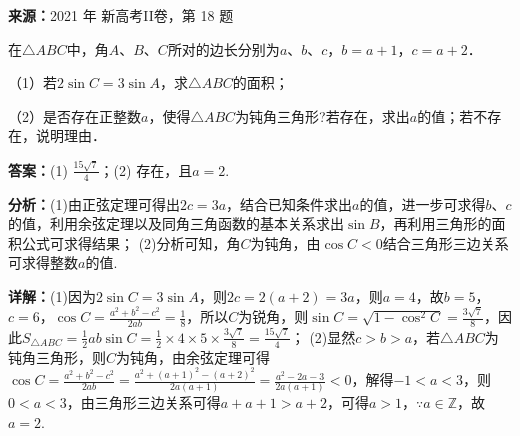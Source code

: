 \begin{question}[points=12]
\textbf{来源：}2021 年 新高考II卷，第 18 题\par
在$\triangle ABC$中，角$A$、$B$、$C$所对的边长分别为$a$、$b$、$c$，$b=a+1$，$c=a+2$．

（1）若$2\sin C=3\sin A$，求$\triangle ABC$的面积；

（2）是否存在正整数$a$，使得$\triangle ABC$为钝角三角形?若存在，求出$a$的值；若不存在，说明理由．
\begin{solution}
\textbf{答案：}(1) $\frac{15\sqrt{7}}{4}$；(2) 存在，且$a=2$.

\textbf{分析：}(1)由正弦定理可得出$2c=3a$，结合已知条件求出$a$的值，进一步可求得$b$、$c$的值，利用余弦定理以及同角三角函数的基本关系求出$\sin B$，再利用三角形的面积公式可求得结果； (2)分析可知，角$C$为钝角，由$\cos C<0$结合三角形三边关系可求得整数$a$的值.

\textbf{详解：}(1)因为$2\sin C=3\sin A$，则$2c=2(a+2)=3a$，则$a=4$，故$b=5$，$c=6$，$\cos C=\frac{a^2+b^2-c^2}{2ab}=\frac{1}{8}$，所以$C$为锐角，则$\sin C=\sqrt{1-\cos^2 C}=\frac{3\sqrt{7}}{8}$，因此$S_{\triangle ABC}=\frac{1}{2}ab\sin C=\frac{1}{2}\times4\times5\times\frac{3\sqrt{7}}{8}=\frac{15\sqrt{7}}{4}$； (2)显然$c>b>a$，若$\triangle ABC$为钝角三角形，则$C$为钝角，由余弦定理可得$\cos C=\frac{a^2+b^2-c^2}{2ab}=\frac{a^2+(a+1)^2-(a+2)^2}{2a(a+1)}=\frac{a^2-2a-3}{2a(a+1)}<0$，解得$-1<a<3$，则$0<a<3$，由三角形三边关系可得$a+a+1>a+2$，可得$a>1$，$\because a\in\mathbb{Z}$，故$a=2$.
\end{solution}
\end{question}

